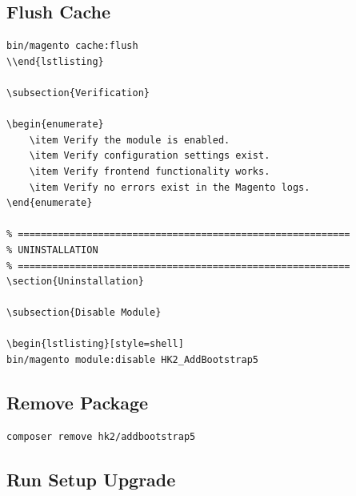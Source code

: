 \documentclass[11pt,a4paper]{article}
\begin{document}
\subsection{Flush Cache}

\begin{lstlisting}[style=shell]
bin/magento cache:flush
\\end{lstlisting}

\subsection{Verification}

\begin{enumerate}
    \item Verify the module is enabled.
    \item Verify configuration settings exist.
    \item Verify frontend functionality works.
    \item Verify no errors exist in the Magento logs.
\end{enumerate}

\section{Uninstallation}

\subsection{Disable Module}

\begin{lstlisting}[style=shell]
bin/magento module:disable HK2_AddBootstrap5
\end{lstlisting}

\subsection{Remove Package}

\begin{lstlisting}[style=shell]
composer remove hk2/addbootstrap5
\end{lstlisting}

\subsection{Run Setup Upgrade}
\end{document}
